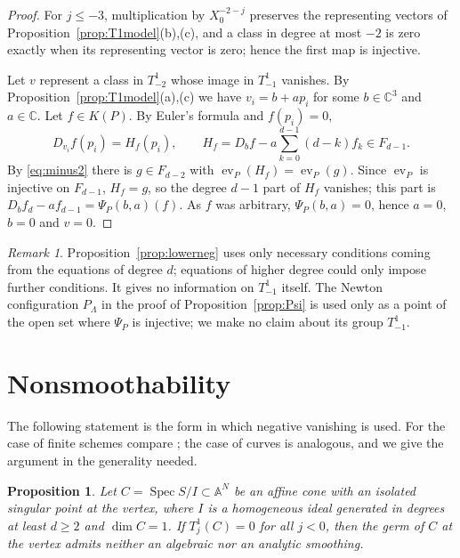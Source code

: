 \documentclass{amsart}
\newtheorem{proposition}[theorem]{Proposition}
\theoremstyle{definition}
\theoremstyle{remark}
\newtheorem{remark}[theorem]{Remark}
\numberwithin{equation}{section}
\newcommand{\CC}{\mathbb{C}}
\newcommand{\A}{\mathbb{A}}
\DeclareMathOperator{\ev}{ev}
\DeclareMathOperator{\Spec}{Spec}
\begin{document}
\begin{proof}
For $j\le-3$, multiplication by $X_0^{-2-j}$ preserves the representing vectors of
Proposition~\ref{prop:T1model}(b),(c), and a class in degree at most $-2$ is zero
exactly when its representing vector is zero; hence the first map is injective.

Let $v$ represent a class in $T^1_{-2}$ whose image in $T^1_{-1}$ vanishes. By
Proposition~\ref{prop:T1model}(a),(c) we have $v_i=b+ap_i$ for some $b\in\CC^3$ and
$a\in\CC$. Let $f\in K(P)$. By Euler's formula and $f(p_i)=0$,
\[
  D_{v_i}f(p_i)=H_f(p_i),\qquad
  H_f=D_bf-a\sum_{k=0}^{d-1}(d-k)f_k\in F_{d-1}.
\]
By \eqref{eq:minus2} there is $g\in F_{d-2}$ with $\ev_P(H_f)=\ev_P(g)$. Since
$\ev_P$ is injective on $F_{d-1}$, $H_f=g$, so the degree $d-1$ part of $H_f$
vanishes; this part is $D_bf_d-af_{d-1}=\Psi_P(b,a)(f)$. As $f$ was arbitrary,
$\Psi_P(b,a)=0$, hence $a=0$, $b=0$ and $v=0$.
\end{proof}

\begin{remark}\label{rem:lowerneg}
Proposition~\ref{prop:lowerneg} uses only necessary conditions coming from the
equations of degree $d$; equations of higher degree could only impose further
conditions. It gives no information on $T^1_{-1}$ itself. The Newton configuration
$P_\Lambda$ in the proof of Proposition~\ref{prop:Psi} is used only as a point of the
open set where $\Psi_P$ is injective; we make no claim about its group $T^1_{-1}$.
\end{remark}

\section{Nonsmoothability}\label{sec:nonsmooth}

The following statement is the form in which negative vanishing is used. For
the case of finite schemes compare \cite[Theorem~1.2]{JelElem}; the case of curves
is analogous, and we give the argument in the generality needed.

\begin{proposition}\label{prop:nonsmooth}
Let $C=\Spec S/I\subset\A^N$ be an affine cone with an isolated singular point at the
vertex, where $I$ is a homogeneous ideal generated in degrees at least $d\ge2$ and
$\dim C=1$. If $T^1_j(C)=0$ for all $j<0$, then the germ of $C$ at the vertex admits
neither an algebraic nor an analytic smoothing.
\end{proposition}
\end{document}
